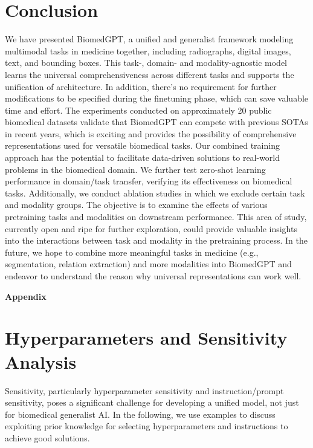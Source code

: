 \documentclass[10pt]{article} \usepackage[preprint]{tmlr}
\begin{document}
\section{Conclusion}
We have presented BiomedGPT, a unified and generalist framework modeling multimodal tasks in medicine together, including radiographs, digital images, text, and bounding boxes. This task-, domain- and modality-agnostic model learns the universal comprehensiveness across different tasks and supports the unification of architecture. In addition, there's no requirement for further modifications to be specified during the finetuning phase, which can save valuable time and effort. The experiments conducted on approximately 20 public biomedical datasets validate that BiomedGPT can compete with previous SOTAs in recent years, which is exciting and provides the possibility of comprehensive representations used for versatile biomedical tasks. Our combined training approach has the potential to facilitate data-driven solutions to real-world problems in the biomedical domain. We further test zero-shot learning performance in domain/task transfer, verifying its effectiveness on biomedical tasks. Additionally, we conduct ablation studies in which we exclude certain task and modality groups. The objective is to examine the effects of various pretraining tasks and modalities on downstream performance. This area of study, currently open and ripe for further exploration, could provide valuable insights into the interactions between task and modality in the pretraining process. In the future, we hope to combine more meaningful tasks in medicine (e.g., segmentation, relation extraction) and more modalities into BiomedGPT and endeavor to understand the reason why universal representations can work well.




\newpage



\clearpage
\appendix 
\label{sec:appendix}

{\LARGE \bf \noindent Appendix}

\section{Hyperparameters and Sensitivity Analysis} \label{appx:hyperparam}

Sensitivity, particularly hyperparameter sensitivity and instruction/prompt sensitivity, poses a significant challenge for developing a unified model, not just for biomedical generalist AI. In the following, we use examples to discuss exploiting prior knowledge for selecting hyperparameters and instructions to achieve good solutions. 
\end{document}
